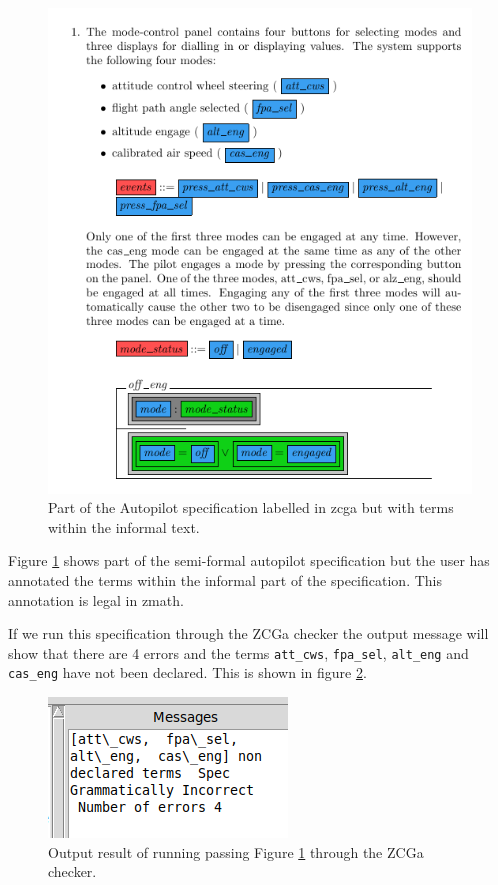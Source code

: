 \begin{figure}[H]
    \centering
    \includegraphics[scale=0.5]{Figures/zcga/semiformZcgaIncorrect.png}
    \caption{Part of the Autopilot specification labelled in
     \gls{zcga} but with terms within the informal text. \label{fig:zcgautopilotzcgaincorrect}}
    \end{figure}

Figure \ref{fig:zcgautopilotzcgaincorrect} shows part of the semi-formal autopilot
specification but the user has annotated the terms within the informal part of
the specification. This annotation is legal in \gls{zmath}.

If we run this specification through the ZCGa checker the output message will
show that there are 4 errors and the terms \texttt{att\_cws}, \texttt{fpa\_sel},
\texttt{alt\_eng} and \texttt{cas\_eng} have not been declared. This is shown in
figure \ref{fig:zcgaautopilotresult}.

\begin{figure}[H]
    \centering
    \includegraphics[scale=0.4]{Figures/zcga/semiformsmessage.png}
    \caption{Output result of running passing Figure \ref{fig:zcgautopilotzcgaincorrect} 
    through the ZCGa checker. \label{fig:zcgaautopilotresult}}
\end{figure}

